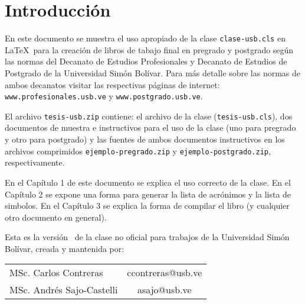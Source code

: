 \chapter*{Introducci\'on}

En este documento se muestra el uso apropiado de la clase \texttt{clase-usb.cls} en \LaTeX~para la creaci\'on de libros de tabajo final en pregrado y postgrado seg\'un las normas del Decanato de Estudios Profesionales y Decanato de Estudios de Postgrado de la Universidad Sim\'on Bol\'ivar. Para m\'as detalle sobre las normas de ambos decanatos visitar las respectivas p\'aginas de internet: \texttt{www.profesionales.usb.ve} y \texttt{www.postgrado.usb.ve}.
\par El archivo \texttt{tesis-usb.zip} contiene: el archivo de la clase ({\tt tesis-usb.cls}), dos documentos de muestra e instructivos para el uso de la clase (uno para pregrado y otro para postgrado) y las fuentes de ambos documentos instructivos en los archivos comprimidos \texttt{ejemplo-pregrado.zip} y \texttt{ejemplo-postgrado.zip}, respectivamente. 
\par En el Cap\'itulo 1 de este documento se explica el uso correcto de la clase. En el Cap\'itulo 2 se expone una forma para generar la lista de acr\'onimos y la lista de simbolos. En el Cap\'itulo 3 se explica la forma de compilar el libro (y cualquier otro documento en general).
\vfill
\par Esta es la versi\'on \version~de la clase no oficial para trabajos de la Universidad Sim\'on Bol\'ivar, creada y mantenida por:\\
\begin{tabular}{lc}
MSc. Carlos Contreras & ccontreras@usb.ve \\
MSc. Andr\'es Sajo-Castelli & asajo@usb.ve 
\end{tabular}
